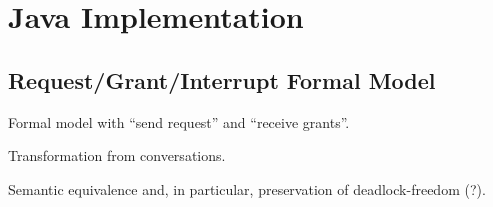 
\section{Java Implementation}
\label{sec:java}


\subsection{Request/Grant/Interrupt Formal Model}
\label{sec:internal:model}


Formal model with ``send request'' and ``receive grants''.

Transformation from conversations.

Semantic equivalence and, in particular, preservation of deadlock-freedom
(?).

